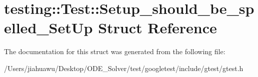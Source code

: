 \hypertarget{structtesting_1_1_test_1_1_setup__should__be__spelled___set_up}{}\section{testing\+:\+:Test\+:\+:Setup\+\_\+should\+\_\+be\+\_\+spelled\+\_\+\+Set\+Up Struct Reference}
\label{structtesting_1_1_test_1_1_setup__should__be__spelled___set_up}


The documentation for this struct was generated from the following file\+:\begin{DoxyCompactItemize}
\item 
/\+Users/jiahuawu/\+Desktop/\+O\+D\+E\+\_\+\+Solver/test/googletest/include/gtest/gtest.\+h\end{DoxyCompactItemize}
